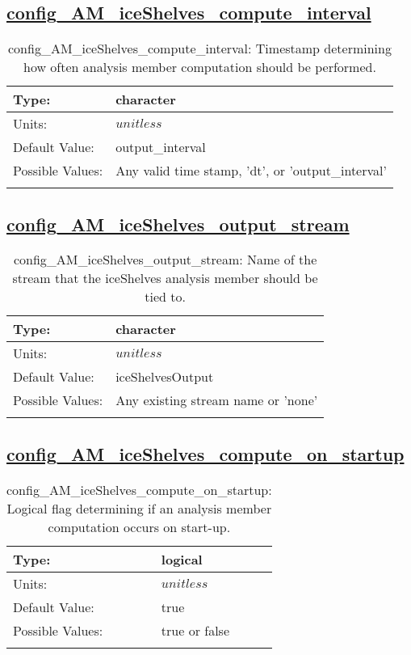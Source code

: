 \subsection[config\_AM\_iceShelves\_compute\_interval]{\hyperref[sec:nm_tab_AM_iceShelves]{config\_AM\_iceShelves\_compute\_interval}}
\label{subsec:nm_sec_config_AM_iceShelves_compute_interval}
\begin{center}
\begin{longtable}{| p{2.0in} || p{4.0in} |}
    \hline
    Type: & character \\
    \hline
    Units: & $unitless$ \\
    \hline
    Default Value: & output\_interval \\
    \hline
    Possible Values: & Any valid time stamp, 'dt', or 'output\_interval' \\
    \hline
    \caption{config\_AM\_iceShelves\_compute\_interval: Timestamp determining how often analysis member computation should be performed.}
\end{longtable}
\end{center}
\subsection[config\_AM\_iceShelves\_output\_stream]{\hyperref[sec:nm_tab_AM_iceShelves]{config\_AM\_iceShelves\_output\_stream}}
\label{subsec:nm_sec_config_AM_iceShelves_output_stream}
\begin{center}
\begin{longtable}{| p{2.0in} || p{4.0in} |}
    \hline
    Type: & character \\
    \hline
    Units: & $unitless$ \\
    \hline
    Default Value: & iceShelvesOutput \\
    \hline
    Possible Values: & Any existing stream name or 'none' \\
    \hline
    \caption{config\_AM\_iceShelves\_output\_stream: Name of the stream that the iceShelves analysis member should be tied to.}
\end{longtable}
\end{center}
\subsection[config\_AM\_iceShelves\_compute\_on\_startup]{\hyperref[sec:nm_tab_AM_iceShelves]{config\_AM\_iceShelves\_compute\_on\_startup}}
\label{subsec:nm_sec_config_AM_iceShelves_compute_on_startup}
\begin{center}
\begin{longtable}{| p{2.0in} || p{4.0in} |}
    \hline
    Type: & logical \\
    \hline
    Units: & $unitless$ \\
    \hline
    Default Value: & true \\
    \hline
    Possible Values: & true or false \\
    \hline
    \caption{config\_AM\_iceShelves\_compute\_on\_startup: Logical flag determining if an analysis member computation occurs on start-up.}
\end{longtable}
\end{center}
